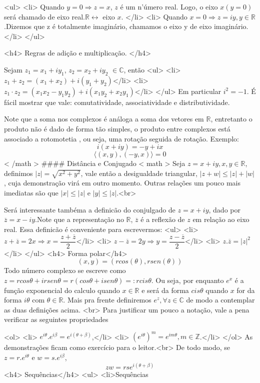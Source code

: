 <ul>
<li> Quando $y=0 \Rightarrow z = x $, $z$ é um n'úmero real. Logo, o eixo $x(y=0)$ será chamado de eixo real.$\mathbb{R} \leftrightarrow$ eixo $x$. </li>
<li> Quando $x=0 \Rightarrow z = iy, y \in \mathbb{R}$.Dizemos que z é totalmente imaginário, chamamos o eixo y de eixo imaginário.</li>
</ul>

<h4> Regras de adição e multiplicação. </h4>

Sejam $z_1 = x_1+iy_1$, $z_2 = x_2+iy_2$ $\in \mathbb{C}$, então
<ul>
<li> $z_1+z_2 = (x_1+x_2)+i(y_1+y_2)$</li>
<li> $z_1\cdot z_2 = (x_1x_2-y_1y_2)+i(x_1y_2+x_2y_1)$</li>
</ul>
Em particular $i^2=-1$. É fácil mostrar que vale: comutatividade,
associatividade e distributividade.

Note que a soma nos complexos é análoga a soma dos vetores em $\mathbb{R}$, entretanto o produto não é dado de forma tão simples, o produto entre complexos está associado a rotomotetia , ou seja, uma rotação seguida de rotação. Exemplo:
$$i(x+iy) = -y+ix$$
$$\langle (x,y), (-y,x)\rangle = 0$$
{{< /math >}}
#### Distância e Conjugado
{{< math >}}
Seja $z = x+iy, x,y \in \mathbb{R}$, definimos $|z| = \sqrt{x^2+y^2}$, vale
então a desigualdade triangular, $|z+w| \leqslant |z|+|w|$, cuja demonstração
virá em outro momento. Outras relações um pouco mais imediatas são que $|x|
\leqslant |z|$ e $|y| \leqslant |z|$.<br>

Será interessante tambéma a definicão do conjulgado de $z = x+iy$, dado por $\overline{z} = x-iy$.Note que a representação no $\mathbb{R}$, $\overline{z}$ é a reflexão de $z$ em relação ao eixo real. Essa definicão é conveniente para escrevermos:
<ul>
<li> $z+\overline{z} = 2x \Rightarrow x = \dfrac{z+\overline{z}}{2}$</li>
<li> $z-\overline{z} = 2y \Rightarrow y = \dfrac{z-\overline{z}}{2}$</li>
<li> $z.\overline{z} = |z|^2$</li>
</ul>
<h4> Forma polar</h4>
$$(x,y) = (rcos(\theta),rsen(\theta))$$
Todo número complexo se escreve como $z = rcos\theta + ir sen\theta = r(cos\theta + i sen \theta )=:r cis \theta$. Ou seja, por enquanto $e^x$ é a função exponencial do calculo quando $x \in \mathbb{R}$ e será da forma $cis\theta$ quando $x$ for da forma $i\theta$ com $\theta \in \mathbb{R}$. Mais pra frente definiremos $e^z ,\forall z \in \mathbb{C}$ de modo a contemplar as duas definições acima. <br>
Para justificar um pouco a notação, vale a pena verificar as seguintes propriedades

<ol>
<li> $e^{i\theta}.e^{i\beta} = e^{i(\theta+\beta)}$,</li>
<li> $(e^{i\theta})^m = e^{im\theta},m \in \mathbb{Z}$.</li>
</ol>
As demonstrações ficam como exercício para o leitor.<br>
De todo modo, se $z = r.e^{i\theta}$ e $w = s .e^{i\beta}$,$$zw = rse^{i(\theta+\beta)}$$
<h4> Sequências</h4>
<ul>
<li>Sequências

